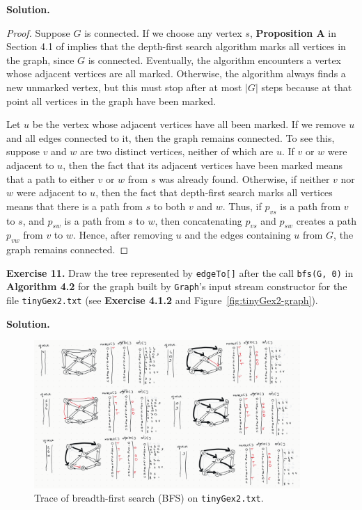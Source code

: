 \documentclass[12pt, a4paper]{article}
\newenvironment{ex}[2][Exercise]
{\par\medskip\noindent \textbf{#1 #2.}}
{\medskip}
\newenvironment{sol}[1][Solution]
{\par\medskip\noindent \textbf{#1.} }
{\medskip}
\begin{document}
	\begin{sol}
		\begin{proof}
			Suppose $G$ is connected. If we choose any vertex $s$, \textbf{Proposition A}
			in Section 4.1 of \cite{sedgewick_wayne} implies that the depth-first search
			algorithm marks all vertices in the graph, since $G$ is connected.
			Eventually, the algorithm encounters a vertex whose adjacent vertices
			are all marked. Otherwise, the algorithm always finds a new unmarked
			vertex, but this must stop after at most $|G|$ steps because at that
			point all vertices in the graph have been marked.
			
			Let $u$ be the vertex whose adjacent vertices have all been marked. If we remove
			$u$ and all edges connected to it, then the graph remains connected. To see
			this, suppose $v$ and $w$ are two distinct vertices, neither of which are $u$.
			If $v$ or $w$ were adjacent to $u$, then the fact that its adjacent vertices
			have been marked means that a path to either $v$ or $w$ from $s$ was already
			found. Otherwise, if neither $v$ nor $w$ were adjacent to $u$, then the
			fact that depth-first search marks all vertices means that there is a path
			from $s$ to both $v$ and $w$. Thus, if $p_{vs}$ is a path from $v$ to $s$,
			and $p_{sw}$ is a path from $s$ to $w$, then concatenating $p_{vs}$ and $p_{sw}$
			creates a path $p_{vw}$ from $v$ to $w$. Hence, after removing $u$ and
			the edges containing $u$ from $G$, the graph remains connected.
		\end{proof}
	\end{sol}
	\begin{ex}{11}
		Draw the tree represented by \texttt{edgeTo[]} after the call \texttt{bfs(G, 0)}
		in \textbf{Algorithm 4.2} for the graph built by \texttt{Graph}'s input stream
		constructor for the file \texttt{tinyGex2.txt} (see \textbf{Exercise 4.1.2} and
		Figure~\ref{fig:tinyGex2-graph}).
	\end{ex}
	\begin{sol}
		\begin{figure}
			\centering
			\includegraphics[width=0.9\textwidth]{exercise-11-bfs}
			\caption{Trace of breadth-first search (BFS) on \texttt{tinyGex2.txt}.}
			\label{fig:ex-11-bfs}
		\end{figure}
	\end{sol}
\end{document}
